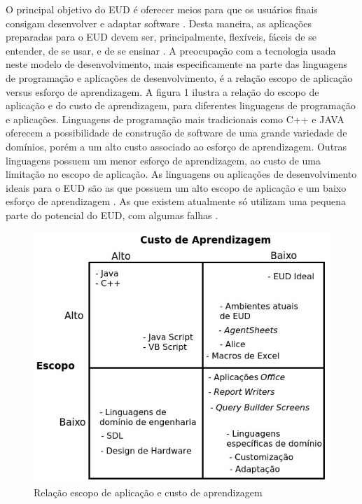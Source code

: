 O principal objetivo do EUD é oferecer meios para que os usuários finais consigam desenvolver e adaptar software \cite{lieberman2006}. Desta maneira, as aplicações preparadas para o EUD devem ser, principalmente, flexíveis, fáceis de se entender, de se usar, e de se ensinar \cite{lieberman2006}. A preocupação com a tecnologia usada neste modelo de desenvolvimento, mais especificamente na parte das linguagens de programação e aplicações de desenvolvimento, é a relação escopo de aplicação versus esforço de aprendizagem. A figura 1 ilustra a relação do escopo de aplicação e do custo de aprendizagem, para diferentes linguagens de programação e aplicações. Linguagens de programação mais tradicionais como C++ e JAVA oferecem a possibilidade de construção de software de uma grande variedade de domínios, porém a um alto custo associado ao esforço de aprendizagem. Outras linguagens possuem um menor esforço de aprendizagem, ao custo de uma limitação no escopo de aplicação. As linguagens ou aplicações de desenvolvimento ideais para o EUD são as que possuem um alto escopo de aplicação e um baixo esforço de aprendizagem \cite{fischer2004}. As que existem atualmente só utilizam uma pequena parte do potencial do EUD, com algumas falhas \cite{paterno2013}.

\begin{figure}[h]
	\centering
	\label{fig01}
		\includegraphics[scale=0.8]{figuras/trade_off_eud_editado}
	\caption{Relação escopo de aplicação e custo de aprendizagem}
\end{figure}
\pagebreak

